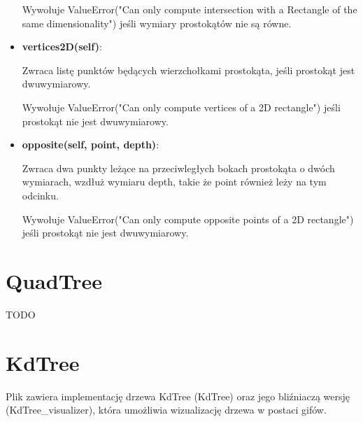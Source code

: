 \documentclass{lab}
\begin{document}
\begin{itemize}
  Wywołuje ValueError("Can only compute intersection with a Rectangle of the same dimensionality") jeśli wymiary prostokątów nie są równe.

  \item \textbf{vertices2D(self)}:

  Zwraca listę punktów będących wierzchołkami prostokąta, jeśli prostokąt jest dwuwymiarowy.

  Wywołuje ValueError("Can only compute vertices of a 2D rectangle") jeśli prostokąt nie jest dwuwymiarowy.

  \item \textbf{opposite(self, point, depth)}:

  Zwraca dwa punkty leżące na przeciwległych bokach prostokąta o dwóch wymiarach, wzdłuż wymiaru depth, takie że point również leży na tym odcinku.

  Wywołuje ValueError("Can only compute opposite points of a 2D rectangle") jeśli prostokąt nie jest dwuwymiarowy. 
\end{itemize}

\section{QuadTree}
TODO

\section{KdTree}
Plik zawiera implementację drzewa KdTree (KdTree) oraz jego bliźniaczą wersję (KdTree\_visualizer), która umożliwia wizualizację drzewa w postaci gifów.
\end{document}
